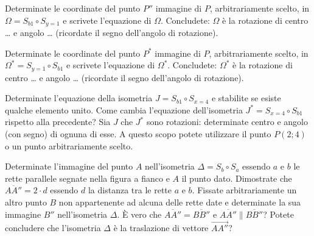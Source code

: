\begin{esercizio}
\label{ese:8.71} %
Determinate le coordinate del punto $P''$ immagine di $P$, arbitrariamente scelto, in $\Omega = S_{b1} \circ S_{y=1}$ e scrivete l'equazione di $\Omega$.
Concludete: $\Omega$ è la rotazione di centro \ldots{} e angolo \ldots{} (ricordate il segno dell'angolo di rotazione).
\end{esercizio}

\begin{esercizio}
\label{ese:8.72} %
Determinate le coordinate del punto $P^*$ immagine di $P$, arbitrariamente scelto, in $\Omega^*=S_{y=1} \circ S_{b1}$ e scrivete l'equazione di $\Omega^*$.
Concludete: $\Omega^*$ è la rotazione di centro \ldots{} e angolo \ldots{} (ricordate il segno dell'angolo di rotazione).
\end{esercizio}

\begin{esercizio}
\label{ese:8.73} %
Determinate l'equazione della isometria $J=S_{b1} \circ S_{x=4}$ e stabilite se esiste qualche elemento unito. Come cambia l'equazione dell'isometria $J^*=S_{x=4} \circ S_{b1}$ rispetto alla precedente? Sia $J$ che $J^*$ sono rotazioni: determinate centro e angolo (con segno) di ognuna di esse. A questo scopo potete utilizzare il punto $P(2;4)$ o un punto arbitrariamente scelto.
\end{esercizio}

\noindent\begin{minipage}{0.7\textwidth}\parindent15pt
\begin{esercizio}
\label{ese:8.74} %
Determinate l'immagine del punto $A$ nell'isometria $\Delta=S_b \circ S_a$ essendo $a$ e $b$ le rette parallele segnate nella figura a fianco e $A$ il punto dato. Dimostrate che $\overline{AA''}=2\cdot d$ essendo $d$ la distanza tra le rette $a$ e $b$.
Fissate arbitrariamente un altro punto $B$ non appartenente ad alcuna delle rette date e determinate la sua immagine $B''$ nell'isometria $\Delta$.
\`E vero che $\overline{AA''}=\overline{BB''}$ e $\overline{AA''} \parallel \overline{BB''}$? Potete concludere che l'isometria $\Delta$ è la traslazione di vettore $\overrightarrow{AA''}$?
\end{esercizio}
\end{minipage}\hfil
\begin{minipage}{0.3\textwidth}
	\centering~~
\end{minipage}\vspace{8pt}

